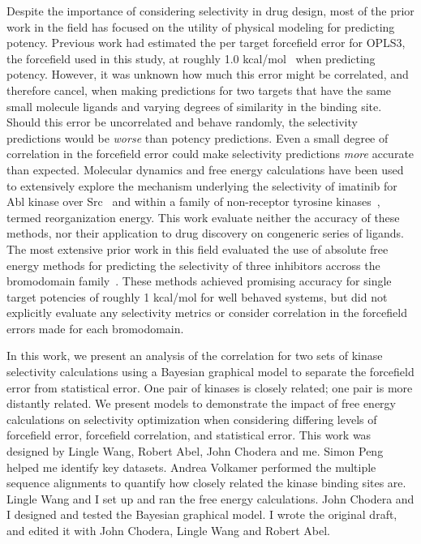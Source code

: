 \documentclass[phd,tocprelim]{cornell}
\begin{document}
Despite the importance of considering selectivity in drug design, most of the prior work in the field has focused on the utility of physical modeling for predicting potency. Previous work had estimated the per target forcefield error for OPLS3, the forcefield used in this study, at roughly 1.0 kcal/mol~\citep{Harder:J.Chem.TheoryComput.:2016} when predicting potency. However, it was unknown how much this error might be correlated, and therefore cancel, when making predictions for two targets that have the same small molecule ligands and varying degrees of similarity in the binding site. Should this error be uncorrelated and behave randomly, the selectivity predictions would be \emph{worse} than potency predictions. Even a small degree of correlation in the forcefield error could make selectivity predictions \emph{more} accurate than expected. Molecular dynamics and free energy calculations have been used to extensively explore the mechanism underlying the selectivity of imatinib for Abl kinase over Src~\citep{Lin2013-ft,Lin2014-iv} and within a family of non-receptor tyrosine kinases~\citep{Lin2013-mu}, termed reorganization energy. This work evaluate neither the accuracy of these methods, nor their application to drug discovery on congeneric series of ligands. The most extensive prior work in this field evaluated the use of absolute free energy methods for predicting the selectivity of three inhibitors accross the bromodomain family~\citep{Aldeghi2017-ox}. These methods achieved promising accuracy for single target potencies of roughly 1 kcal/mol for well behaved systems, but did not explicitly evaluate any selectivity metrics or consider correlation in the forcefield errors made for each bromodomain.  

In this work, we present an analysis of the correlation for two sets of kinase selectivity calculations using a Bayesian graphical model to separate the forcefield error from statistical error. One pair of kinases is closely related; one pair is more distantly related.  We present models to demonstrate the impact of free energy calculations on selectivity optimization when considering differing levels of forcefield error, forcefield correlation, and statistical error. This work was designed by Lingle Wang, Robert Abel, John Chodera and me. Simon Peng helped me identify key datasets. Andrea Volkamer performed the multiple sequence alignments to quantify how closely related the kinase binding sites are. Lingle Wang and I set up and ran the free energy calculations. John Chodera and I designed and tested the Bayesian graphical model. I wrote the original draft, and edited it with John Chodera, Lingle Wang and Robert Abel. 
\end{document}
